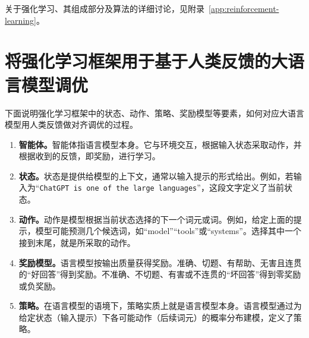关于强化学习、其组成部分及算法的详细讨论，见附录~\ref{app:reinforcement-learning}。

\section{将强化学习框架用于基于人类反馈的大语言模型调优}
\label{sec:ch05-map-rlhf}
下面说明强化学习框架中的状态、动作、策略、奖励模型等要素，如何对应大语言模型用人类反馈做对齐调优的过程。

\begin{enumerate}
\item \textbf{智能体。}智能体指语言模型本身。它与环境交互，根据输入状态采取动作，并根据收到的反馈，即奖励，进行学习。
\item \textbf{状态。}状态是提供给模型的上下文，通常以输入提示的形式给出。例如，若输入为“\texttt{ChatGPT is one of the large languages}”，这段文字定义了当前状态。
\item \textbf{动作。}动作是模型根据当前状态选择的下一个词元或词。例如，给定上面的提示，模型可能预测几个候选词，如“model”“tools”或“systems”。选择其中一个接到末尾，就是所采取的动作。
\item \textbf{奖励模型。}语言模型按输出质量获得奖励。准确、切题、有帮助、无害且连贯的“好回答”得到奖励。不准确、不切题、有害或不连贯的“坏回答”得到零奖励或负奖励。
\item \textbf{策略。}在语言模型的语境下，策略实质上就是语言模型本身。语言模型通过为给定状态（输入提示）下各可能动作（后续词元）的概率分布建模，定义了策略。
\end{enumerate}
